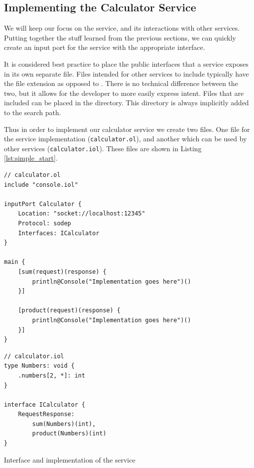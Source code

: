 \subsection{Implementing the Calculator Service}

We will keep our focus on the  service, and its interactions
with other services. Putting together the stuff learned from the previous
sections, we can quickly create an input port for the service with the
appropriate interface.

It is considered best practice to place the public interfaces that a service
exposes in its own separate file. Files intended for other services to include
typically have the file extension  as opposed to . There
is no technical difference between the two, but it allows for the developer to
more easily express intent. Files that are included can be placed in the
 directory. This directory is always implicitly added to the
search path.

Thus in order to implement our calculator service we create two files. One file
for the service implementation (\verb!calculator.ol!), and another which can be
used by other services (\verb!calculator.iol!). These files are shown in
Listing \ref{lst:simple_start}.

\begin{listing}[H]
\begin{multicols}{2}

\begin{verbatim}
// calculator.ol
include "console.iol"

inputPort Calculator {
    Location: "socket://localhost:12345"
    Protocol: sodep
    Interfaces: ICalculator
}

main {
    [sum(request)(response) {
        println@Console("Implementation goes here")()
    }]

    [product(request)(response) {
        println@Console("Implementation goes here")()
    }]
}
\end{verbatim}

\columnbreak

\begin{verbatim}
// calculator.iol
type Numbers: void {
    .numbers[2, *]: int
}

interface ICalculator {
    RequestResponse:
        sum(Numbers)(int),
        product(Numbers)(int)
}
\end{verbatim}
\end{multicols}
\caption{Interface and implementation of the  service}
\label{lst:simple_start}
\end{listing}

